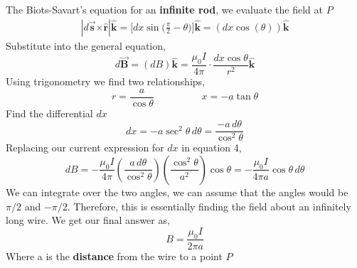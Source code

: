 \documentclass[12pt, titlepage, oneside]{article}
\let\oldhat\hat
\let\oldvec\vec
\newcommand{\cross}{\bm{\times}}
\renewcommand{\hat}[1]{\oldhat{\mathbf{#1}}}
\renewcommand{\vec}[1]{\oldvec{\bm{#1}}}
\renewcommand{\hat}[1]{\oldhat{\bm{#1}}}
\renewcommand{\b}[1]{\textbf{#1}}
\begin{document}
The Biots-Savart's  equation for an \b{infinite rod}, we evaluate the field at $P$
\begin{align*}
| d\vec{s}  \cross \hat{r} |\hat{k} = \Bigg[dx \sin\bigg(\frac{\pi}{2}-\theta\bigg)\Bigg] \hat{k} = (dx \cos(\theta))\hat{k}
\end{align*}
Substitute into the general equation,
\begin{equation}
d\vec{B} = (dB)\hat{k} = \frac{\mu_0 I}{4\pi} \cdot \frac{dx \cos\theta}{r^2} \hat{k}
\end{equation}
Using trigonometry we find two relationships,
\begin{equation}
r = \frac{a}{\cos\theta} \hspace{2cm}
x = -a \tan \theta
\end{equation}
Find the differential $dx$
\begin{equation}
dx = -a \sec^2\theta \, d\theta = \frac{-a\, d\theta}{\cos^2\theta}
\end{equation}
Replacing our current expression for $dx$ in equation 4,
\begin{equation}
dB = -\frac{\mu_0 I }{4\pi} \left(\frac{a \, d\theta }{\cos^2\theta}\right) \left(\frac{\cos^2\theta}{a^2} \right) \cos\theta = -\frac{\mu_0 I}{4\pi a} \cos\theta \, d\theta
\end{equation}
We can integrate over the two angles, we can assume that the angles would be $\pi/2$ and $-\pi/2$. Therefore, this is essentially finding the field about an infinitely long wire. We get our final answer as,
\begin{equation}
B = \frac{\mu_0 I}{2\pi a}
\end{equation}
Where a is the \textbf{distance} from the wire to a point $P$
\\
\end{document}
